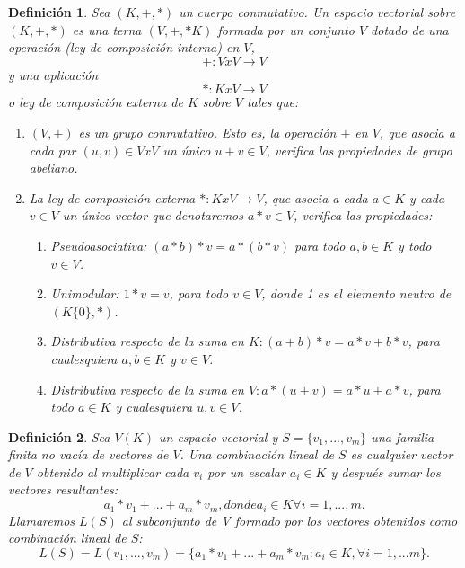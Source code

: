 \documentclass[a4paper,11pt, oneside]{book}
\newtheorem{defi}{Definición}
\begin{document}
\begin{defi}
	Sea $(K, +, *)$ un cuerpo conmutativo. Un espacio vectorial sobre $(K, +, *)$ es una terna $(V, +, *K)$ formada por un conjunto $V$ dotado de una operación (ley de composición interna) en $V$,
	\begin{equation}
	+ : V x V \rightarrow V
	\end{equation}
	y una aplicación
	\begin{equation}
	* : K x V \rightarrow V
	\end{equation}
	o ley de composición externa de $K$ sobre $V$ tales que:
	\begin{enumerate}
	\item $(V, +)$ es un grupo conmutativo. Esto es, la operación $+$ en $V$, que asocia a cada par $(u,v) \in V x V$ un único $u+v \in V$, verifica las propiedades de grupo abeliano.
	\item La ley de composición externa $* : K x V \rightarrow V$, que asocia a cada $a \in K$ y cada $
	v \in V$ un único vector que denotaremos $a * v \in V$, verifica las propiedades:
	\begin{enumerate}
		\item Pseudoasociativa: $(a * b)*v = a*(b*v)$ para todo $a,b \in K$ y todo $v \in V$.
		\item Unimodular: $1*v = v$, para todo $v \in V$, donde 1 es el elemento neutro de $(K\{0\},*)$.
		\item Distributiva respecto de la suma en $K:(a+b)*v=a*v+b*v$, para cualesquiera $a,b \in K$ y $v \in V$.
		\item Distributiva respecto de la suma en $V: a*(u+v) = a*u+a*v$, para todo $a \in K$ y cualesquiera $u,v \in V$.
	\end{enumerate}
	\end{enumerate}
\end{defi}
\begin{defi}
	Sea $V(K)$ un espacio vectorial y $S = \{v_1,...,v_m\}$ una familia finita no vacía de vectores de $V$. Una combinación lineal de $S$ es cualquier vector de $V$ obtenido al multiplicar cada $v_i$ por un escalar $a_i \in K$ y después sumar los vectores resultantes:
	\begin{equation}
	a_1*v_1+...+a_m*v_m, donde a_i \in K \forall i = 1,...,m.
	\end{equation}
	Llamaremos $L(S)$ al subconjunto de V formado por los vectores obtenidos como combinación lineal de $S$:
	\begin{equation}
	L(S) = L(v_1,...,v_m) = \{a_1*v_1+...+a_m*v_m : a_i \in K, \forall i = 1,...m\}.
	\end{equation}
\end{defi}
\end{document}
